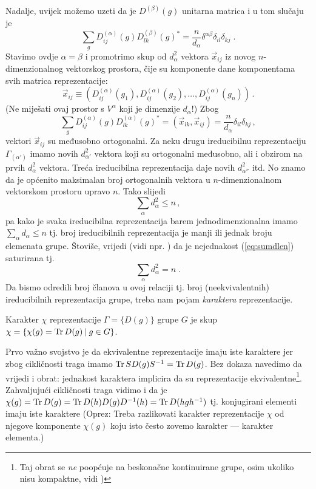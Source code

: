 Nadalje, uvijek možemo uzeti da je $D^{(\beta)}(g)$ unitarna matrica
i u tom slučaju je
\begin{displaymath}
\sum_g D^{(\alpha)}_{ij}(g) D^{(\beta)}_{lk}(g)^* =
 \frac{n}{d_{\alpha}}\delta^{\alpha\beta}\delta_{il}\delta_{kj} \;.
\end{displaymath}
Stavimo ovdje $\alpha=\beta$ i promotrimo skup od $d^{2}_\alpha$ vektora
$\vec{x}_{ij}$ iz novog $n$-di\-men\-zi\-o\-nal\-nog vektorskog prostora,  čije
su komponente dane komponentama svih matrica reprezentacije:
\begin{displaymath}
\vec{x}_{ij} \equiv
(D^{(\alpha)}_{ij}(g_1), D^{(\alpha)}_{ij}(g_2), \ldots, 
D^{(\alpha)}_{ij}(g_n)) \,.
\end{displaymath}
(Ne miješati ovaj
prostor s $V^{\alpha}$ koji je dimenzije $d_\alpha$!) Zbog
\begin{displaymath}
\sum_g D^{(\alpha)}_{ij}(g) D^{(\alpha)}_{lk}(g)^* = (\vec{x}_{lk},\vec{x}_{ij})
 =\frac{n}{d_{\alpha}}\delta_{il}\delta_{kj} \,,
\end{displaymath}
vektori $\vec{x}_{ij}$ su međusobno ortogonalni.
Za neku drugu ireducibilnu reprezentaciju 
$\Gamma_{(\alpha')}$ imamo novih $d_{\alpha'}^{2}$
vektora  koji su ortogonalni međusobno, ali i obzirom na prvih
$d_{\alpha}^{2}$ vektora. Treća ireducibilna reprezentacija daje novih $d_{\alpha''}^{2}$ itd.
No znamo da je općenito maksimalan broj ortogonalnih 
vektora u $n$-dimenzionalnom vektorskom prostoru upravo $n$.
Tako slijedi
\begin{equation}
\sum_{\alpha} d_{\alpha}^{2} \leq n   \,,
\label{eq:sumdlen}
\end{equation}
pa kako je svaka ireducibilna reprezentacija barem jednodimenzionalna
i\-ma\-mo $\sum_{\alpha} d_\alpha \leq n$ tj.
broj ireducibilnih reprezentacija je manji ili jednak broju elemenata grupe.
Štoviše, vrijedi (vidi npr. \cite{Hamermesh:1989}) da je nejednakost
(\ref{eq:sumdlen}) saturirana tj.
\begin{displaymath}
\sum_{\alpha} d_{\alpha}^2 = n \;.
\end{displaymath}
Da bismo odredili broj članova u ovoj relaciji tj.
broj (neekvivalentnih) ireducibilnih reprezentacija grupe, treba nam
pojam \emph{karaktera} reprezentacije.
\begin{definicija}
Karakter $\chi$ reprezentacije $\Gamma=\{D(g)\}$ grupe $G$ je skup
$\chi=\{\chi(g) = \operatorname{Tr} D(g) \: | \:  g\in G\}$.
\end{definicija}
Prvo važno svojstvo je da ekvivalentne reprezentacije imaju iste
karaktere jer zbog cikličnosti traga
imamo $\operatorname{Tr} S D(g) S^{-1} = \operatorname{Tr} D(g)$.
Bez dokaza navedimo da vrijedi i obrat: jednakost karaktera implicira
da su reprezentacije ekvivalentne\footnote{Taj obrat 
    se \emph{ne} poopćuje na beskonačne kontinuirane grupe, osim
ukoliko nisu kompaktne, vidi \cite[302]{Cornwell:1997})}.
Zahvaljujući cikličnosti traga vidimo i da je
$\chi(g)=\operatorname{Tr} D(g) = \operatorname{Tr} D(h) D(g) D^{-1}(h) = \operatorname{Tr} D(hgh^{-1})$
  tj. konjugirani elementi imaju iste karaktere (Oprez: Treba
  razlikovati karakter reprezentacije $\chi$ od njegove komponente
  $\chi(g)$ koju isto često zovemo karakter --- karakter elementa.)

